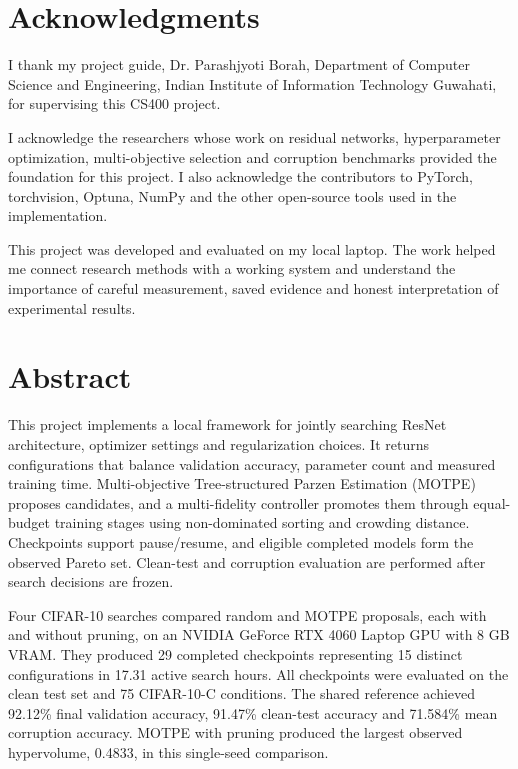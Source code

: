 \documentclass[11pt,a4paper,oneside]{report}
\begin{document}
\chapter*{Acknowledgments}
{}
I thank my project guide, Dr. Parashjyoti Borah, Department of Computer Science and Engineering, Indian Institute of Information Technology Guwahati, for supervising this CS400 project.

I acknowledge the researchers whose work on residual networks, hyperparameter optimization, multi-objective selection and corruption benchmarks provided the foundation for this project. I also acknowledge the contributors to PyTorch, torchvision, Optuna, NumPy and the other open-source tools used in the implementation.

This project was developed and evaluated on my local laptop. The work helped me connect research methods with a working system and understand the importance of careful measurement, saved evidence and honest interpretation of experimental results.
\clearpage
\chapter*{Abstract}
{}

This project implements a local framework for jointly searching ResNet architecture, optimizer settings and regularization choices. It returns configurations that balance validation accuracy, parameter count and measured training time. Multi-objective Tree-structured Parzen Estimation (MOTPE) proposes candidates, and a multi-fidelity controller promotes them through equal-budget training stages using non-dominated sorting and crowding distance. Checkpoints support pause/resume, and eligible completed models form the observed Pareto set. Clean-test and corruption evaluation are performed after search decisions are frozen.

Four CIFAR-10 searches compared random and MOTPE proposals, each with and without pruning, on an NVIDIA GeForce RTX 4060 Laptop GPU with 8 GB VRAM. They produced 29 completed checkpoints representing 15 distinct configurations in 17.31 active search hours. All checkpoints were evaluated on the clean test set and 75 CIFAR-10-C conditions. The shared reference achieved 92.12\% final validation accuracy, 91.47\% clean-test accuracy and 71.584\% mean corruption accuracy. MOTPE with pruning produced the largest observed hypervolume, 0.4833, in this single-seed comparison.
\end{document}
